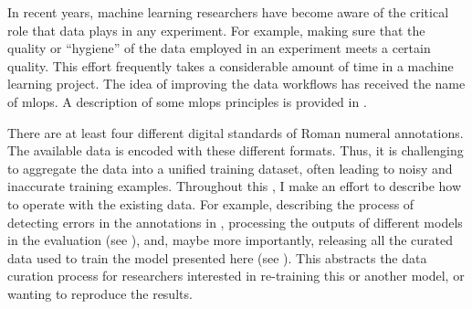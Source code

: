 

In recent years, machine learning researchers have become
aware of the critical role that data plays in any
experiment. For example, making sure that the quality or
``hygiene'' of the data employed in an experiment meets a
certain quality. This effort frequently takes a considerable
amount of time in a machine learning project. The idea of
improving the data workflows has received the name of
\gls{mlops}. A description of some \gls{mlops} principles is
provided in \textcite{renggli2021data}.

There are at least four different digital standards of Roman
numeral annotations. The available data is encoded with
these different formats. Thus, it is challenging to
aggregate the data into a unified training dataset, often
leading to noisy and inaccurate training examples.
Throughout this \thesisdiss{}, I make an effort to describe
how to operate with the existing data. For example,
describing the process of detecting errors in the
annotations in ,
processing the outputs of different models in the evaluation
(see ), and, maybe more
importantly, releasing all the curated data used to train
the model presented here (see ).
This abstracts the data curation process for researchers
interested in re-training this or another model, or wanting
to reproduce the results.